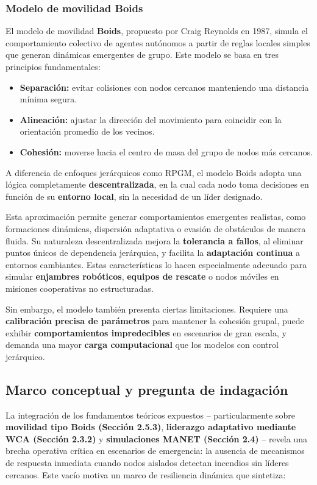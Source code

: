 \documentclass{article}
\begin{document}
\subsubsection{Modelo de movilidad Boids}

El modelo de movilidad \textbf{Boids}, propuesto por Craig Reynolds en 1987, simula el comportamiento colectivo de agentes autónomos a partir de reglas locales simples que generan dinámicas emergentes de grupo. Este modelo se basa en tres principios fundamentales:

\begin{itemize}
    \item \textbf{Separación:} evitar colisiones con nodos cercanos manteniendo una distancia mínima segura.
    \item \textbf{Alineación:} ajustar la dirección del movimiento para coincidir con la orientación promedio de los vecinos.
    \item \textbf{Cohesión:} moverse hacia el centro de masa del grupo de nodos más cercanos.
\end{itemize}

A diferencia de enfoques jerárquicos como RPGM, el modelo Boids adopta una lógica completamente \textbf{descentralizada}, en la cual cada nodo toma decisiones en función de su \textbf{entorno local}, sin la necesidad de un líder designado.

Esta aproximación permite generar comportamientos emergentes realistas, como formaciones dinámicas, dispersión adaptativa o evasión de obstáculos de manera fluida. Su naturaleza descentralizada mejora la \textbf{tolerancia a fallos}, al eliminar puntos únicos de dependencia jerárquica, y facilita la \textbf{adaptación continua} a entornos cambiantes. Estas características lo hacen especialmente adecuado para simular \textbf{enjambres robóticos}, \textbf{equipos de rescate} o nodos móviles en misiones cooperativas no estructuradas.

Sin embargo, el modelo también presenta ciertas limitaciones. Requiere una \textbf{calibración precisa de parámetros} para mantener la cohesión grupal, puede exhibir \textbf{comportamientos impredecibles} en escenarios de gran escala, y demanda una mayor \textbf{carga computacional} que los modelos con control jerárquico.



\subsection{Marco conceptual y pregunta de indagación}
La integración de los fundamentos teóricos expuestos – particularmente sobre \textbf{movilidad tipo Boids (Sección 2.5.3)}, \textbf{liderazgo adaptativo mediante WCA (Sección 2.3.2)} y \textbf{simulaciones MANET (Sección 2.4)} – revela una brecha operativa crítica en escenarios de emergencia: la ausencia de mecanismos de respuesta inmediata cuando nodos aislados detectan incendios sin líderes cercanos. Este vacío motiva un marco de resiliencia dinámica que sintetiza:
\end{document}
